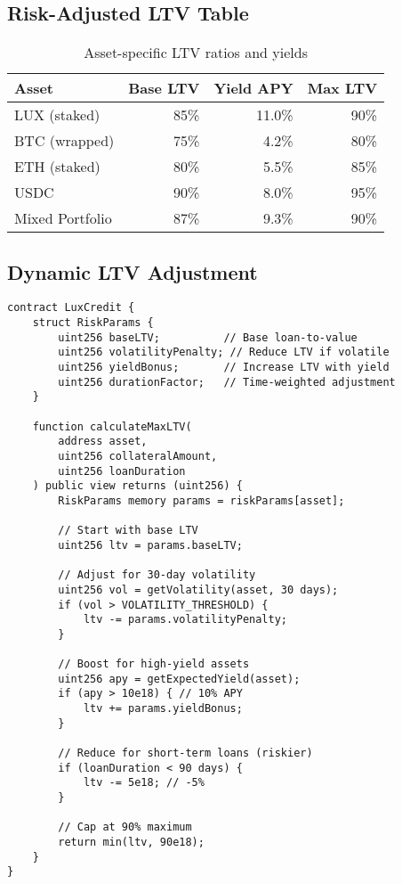 \documentclass[11pt,a4paper]{article}
\begin{document}
\subsection{Risk-Adjusted LTV Table}

\begin{table}[h]
\centering
\begin{tabular}{@{}lrrr@{}}
\toprule
\textbf{Asset} & \textbf{Base LTV} & \textbf{Yield APY} & \textbf{Max LTV} \\ \midrule
LUX (staked) & 85\% & 11.0\% & 90\% \\
BTC (wrapped) & 75\% & 4.2\% & 80\% \\
ETH (staked) & 80\% & 5.5\% & 85\% \\
USDC & 90\% & 8.0\% & 95\% \\
Mixed Portfolio & 87\% & 9.3\% & 90\% \\ \bottomrule
\end{tabular}
\caption{Asset-specific LTV ratios and yields}
\end{table}

\subsection{Dynamic LTV Adjustment}

\begin{lstlisting}[language=Solidity, basicstyle=\small\ttfamily]
contract LuxCredit {
    struct RiskParams {
        uint256 baseLTV;          // Base loan-to-value
        uint256 volatilityPenalty; // Reduce LTV if volatile
        uint256 yieldBonus;       // Increase LTV with yield
        uint256 durationFactor;   // Time-weighted adjustment
    }
    
    function calculateMaxLTV(
        address asset,
        uint256 collateralAmount,
        uint256 loanDuration
    ) public view returns (uint256) {
        RiskParams memory params = riskParams[asset];
        
        // Start with base LTV
        uint256 ltv = params.baseLTV;
        
        // Adjust for 30-day volatility
        uint256 vol = getVolatility(asset, 30 days);
        if (vol > VOLATILITY_THRESHOLD) {
            ltv -= params.volatilityPenalty;
        }
        
        // Boost for high-yield assets
        uint256 apy = getExpectedYield(asset);
        if (apy > 10e18) { // 10% APY
            ltv += params.yieldBonus;
        }
        
        // Reduce for short-term loans (riskier)
        if (loanDuration < 90 days) {
            ltv -= 5e18; // -5%
        }
        
        // Cap at 90% maximum
        return min(ltv, 90e18);
    }
}
\end{lstlisting}
\end{document}
